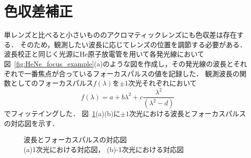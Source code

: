 \section{色収差補正}
\label{sec:chromatic_aberration_correction}
単レンズと比べると小さいもののアクロマティックレンズにも色収差は存在する．
そのため，観測したい波長に応じてレンズの位置を調節する必要がある．
波長校正と同じく光源にHe原子放電管を用いて各発光線において図\ \ref{fig:HeNe_focus_example}(a)のような図を作成し，その発光線の波長とそれぞれで一番焦点が合っているフォーカスパルスの値を記録した．
観測波長の関数としてのフォーカスパルス$f(\lambda)$を$\pm{1}$次光それぞれにおいて
\begin{equation}
     f(\lambda) = a+b\lambda^2+c\frac{\lambda^2}{(\lambda^2-d)}
\end{equation}
でフィッテイングした．
図\ \ref{fig:lambda-focus_fitting}(a)(b)に$\pm{1}$次光における波長とフォーカスパルスの対応図を示す．
\begin{figure}
    \caption{波長とフォーカスパルスの対応図\\
    (a)1次光における対応図，
    (b)-1次光における対応図}
    \label{fig:lambda-focus_fitting}
\end{figure}
